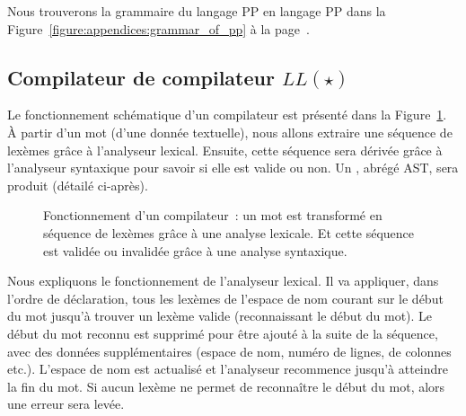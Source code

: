 Nous trouverons la grammaire du langage PP en langage PP dans la
Figure~\ref{figure:appendices:grammar_of_pp} à la
page~\pageref{figure:appendices:grammar_of_pp}.

\subsection{Compilateur de compilateur $LL(\star)$}
\label{subsection:data:compiler-compiler}

Le fonctionnement schématique d'un compilateur est présenté dans la
Figure~\ref{figure:data:compiler}. À partir d'un {\strong mot} (d'une donnée
textuelle), nous allons extraire une {\strong séquence} de lexèmes grâce à
l'analyseur {\strong lexical}. Ensuite, cette séquence sera {\strong dérivée}
grâce à l'analyseur {\strong syntaxique} pour savoir si elle est valide ou non.
Un , abrégé AST, sera produit (détailé
ci-après).
%
\begin{figure}


\caption{\label{figure:data:compiler} Fonctionnement d'un compilateur~: un mot
est transformé en séquence de lexèmes grâce à une analyse lexicale. Et cette
séquence est validée ou invalidée grâce à une analyse syntaxique.}

\end{figure}

Nous expliquons le fonctionnement de l'analyseur lexical. Il va appliquer, dans
l'ordre de déclaration, tous les lexèmes de l'espace de nom courant sur le début
du mot jusqu'à trouver un lexème valide (reconnaissant le début du mot). Le
début du mot reconnu est supprimé pour être ajouté à la suite de la séquence,
avec des données supplémentaires (espace de nom, numéro de lignes, de colonnes
etc.). L'espace de nom est actualisé et l'analyseur recommence jusqu'à atteindre
la fin du mot. Si aucun lexème ne permet de reconnaître le début du mot, alors
une erreur sera levée.

